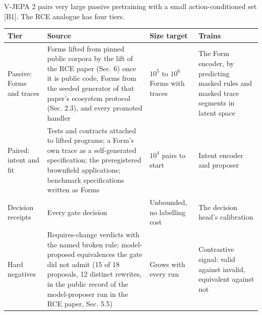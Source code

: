 \documentclass[10pt,letterpaper]{article}
\begin{document}
V-JEPA 2 pairs very large passive pretraining with a small
action-conditioned set {[}B1{]}. The RCE analogue has four tiers.

{\footnotesize\setlength{\tabcolsep}{3.8pt}\renewcommand{\arraystretch}{1.15}
\begin{longtable}[]{@{}
  >{\raggedright\arraybackslash}p{}
  >{\raggedright\arraybackslash}p{}
  >{\raggedright\arraybackslash}p{}
  >{\raggedright\arraybackslash}p{}@{}}
\toprule\noalign{}
\begin{minipage}[b]{\linewidth}\raggedright
\textbf{Tier}
\end{minipage} & \begin{minipage}[b]{\linewidth}\raggedright
\textbf{Source}
\end{minipage} & \begin{minipage}[b]{\linewidth}\raggedright
\textbf{Size target}
\end{minipage} & \begin{minipage}[b]{\linewidth}\raggedright
\textbf{Trains}
\end{minipage} \\
\midrule\noalign{}
\endhead
\bottomrule\noalign{}
\endlastfoot
Passive: Forms and traces & Forms lifted from pinned public corpora by
the lift of the RCE paper (Sec. 6) once it is public code, Forms from
the seeded generator of that paper's ecosystem protocol (Sec. 2.3), and
every promoted handler & \(10^5\) to \(10^6\) Forms with traces & The
Form encoder, by predicting masked rules and masked trace segments in
latent space \\
Paired: intent and fit & Tests and contracts attached to lifted
programs; a Form's own trace as a self-generated specification; the
preregistered brownfield applications; benchmark specifications written
as Forms & \(10^4\) pairs to start & Intent encoder and proposer \\
Decision receipts & Every gate decision & Unbounded, no labelling cost &
The decision head's calibration \\
Hard negatives & Requires-change verdicts with the named broken rule;
model-proposed equivalences the gate did not admit (15 of 18 proposals,
12 distinct rewrites, in the public record of the model-proposer run in
the RCE paper, Sec. 5.5) & Grows with every run & Contrastive signal:
valid against invalid, equivalent against not \\
\end{longtable}
}
\end{document}
